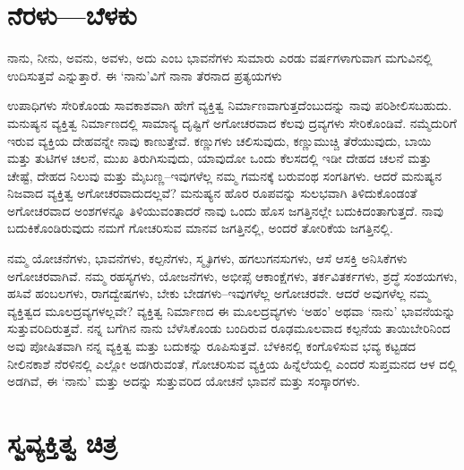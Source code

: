 \section*{ನೆರಳು—ಬೆಳಕು}


{\parfillskip=0pt ನಾನು, ನೀನು, ಅವನು, ಅವಳು, ಅದು ಎಂಬ ಭಾವನೆಗಳು ಸುಮಾರು ಎರಡು ವರ್ಷಗಳಾಗುವಾಗ ಮಗುವಿನಲ್ಲಿ ಉದಿಸುತ್ತವೆ ಎನ್ನುತ್ತಾರೆ. ಈ ‘ನಾನು’ವಿಗೆ ನಾನಾ ತೆರನಾದ ಪ್ರತ್ಯಯಗಳು \par}\newpage\noindent ಉಪಾಧಿಗಳು ಸೇರಿಕೊಂಡು ಸಾವಕಾಶವಾಗಿ ಹೇಗೆ ವ್ಯಕ್ತಿತ್ವ ನಿರ್ಮಾಣವಾಗುತ್ತದೆಂಬುದನ್ನು ನಾವು ಪರಿಶೀಲಿಸಬಹುದು. ಮನುಷ್ಯನ ವ್ಯಕ್ತಿತ್ವ ನಿರ್ಮಾಣದಲ್ಲಿ ಸಾಮಾನ್ಯ ದೃಷ್ಟಿಗೆ ಅಗೋಚರವಾದ ಕೆಲವು ದ್ರವ್ಯಗಳು ಸೇರಿಕೊಂಡಿವೆ. ನಮ್ಮೆದುರಿಗೆ ಇರುವ ವ್ಯಕ್ತಿಯ ದೇಹವನ್ನೇ ನಾವು ಕಾಣುತ್ತೇವೆ. ಕಣ್ಣುಗಳು ಚಲಿಸುವುದು, ಕಣ್ಣುಮುಚ್ಚಿ ತೆರೆಯುವುದು, ಬಾಯಿ ಮತ್ತು ತುಟಿಗಳ ಚಲನೆ, ಮುಖ ತಿರುಗಿಸುವುದು, ಯಾವುದೋ ಒಂದು ಕೆಲಸದಲ್ಲಿ ಇಡೀ ದೇಹದ ಚಲನೆ ಮತ್ತು ಚೇಷ್ಟೆ, ದೇಹದ ನಿಲುವು ಮತ್ತು ಮೈಬಣ್ಣ–ಇವುಗಳೆಲ್ಲ ನಮ್ಮ ಗಮನಕ್ಕೆ ಬರುವಂಥ ಸಂಗತಿಗಳು. ಆದರೆ ಮನುಷ್ಯನ ನಿಜವಾದ ವ್ಯಕ್ತಿತ್ವ ಅಗೋಚರವಾದುದಲ್ಲವೆ? ಮನುಷ್ಯನ ಹೊರ ರೂಪವನ್ನು ಸುಲಭವಾಗಿ ತಿಳಿದುಕೊಂಡಂತೆ ಅಗೋಚರವಾದ ಅಂಶಗಳನ್ನೂ ತಿಳಿಯುವಂತಾದರೆ ನಾವು ಒಂದು ಹೊಸ ಜಗತ್ತಿನಲ್ಲೇ ಬದುಕಿದಂತಾಗುತ್ತದೆ. ನಾವು ಬದುಕಿಕೊಂಡಿರುವುದು ನಮಗೆ ಗೋಚರಿಸುವ ಮಾನವ ಜಗತ್ತಿನಲ್ಲಿ, ಅಂದರೆ ತೋರಿಕೆಯ ಜಗತ್ತಿನಲ್ಲಿ.

ನಮ್ಮ ಯೋಚನೆಗಳು, ಭಾವನೆಗಳು, ಕಲ್ಪನೆಗಳು, ಸ್ಮೃತಿಗಳು, ಹಗಲುಗನಸುಗಳು, ಆಸೆ ಆಸಕ್ತಿ ಅನಿಸಿಕೆಗಳು ಅಗೋಚರವಾಗಿವೆ. ನಮ್ಮ ರಹಸ್ಯಗಳು, ಯೋಜನೆಗಳು, ಅಭೀಪ್ಸೆ ಆಕಾಂಕ್ಷೆಗಳು, ತರ್ಕವಿತರ್ಕಗಳು, ಶ್ರದ್ಧೆ ಸಂಶಯಗಳು, ಹಸಿವೆ ಹಂಬಲಗಳು, ರಾಗದ್ವೇಷಗಳು, ಬೇಕು ಬೇಡಗಳು–ಇವುಗಳೆಲ್ಲ ಅಗೋಚರವೇ. ಆದರೆ ಅವುಗಳೆಲ್ಲ ನಮ್ಮ ವ್ಯಕ್ತಿತ್ವದ ಮೂಲ\-ದ್ರವ್ಯ\-ಗಳಲ್ಲವೇ? ವ್ಯಕ್ತಿತ್ವ ನಿರ್ಮಾಣದ ಈ ಮೂಲದ್ರವ್ಯಗಳು ‘ಅಹಂ’ ಅಥವಾ ‘ನಾನು’ ಭಾವನೆಯನ್ನು ಸುತ್ತುವರಿದಿರುತ್ತವೆ. ನನ್ನ ಬಗೆಗಿನ ನಾನು ಬೆಳೆಸಿಕೊಂಡು ಬಂದಿರುವ ರೂಢಮೂಲವಾದ ಕಲ್ಪನೆಯ ತಾಯಿಬೇರಿನಿಂದ ಅವು ಪೋಷಿತವಾಗಿ ನನ್ನ ವ್ಯಕ್ತಿತ್ವ ಮತ್ತು ಬದುಕನ್ನು ರೂಪಿಸುತ್ತವೆ. ಬೆಳಕಿನಲ್ಲಿ ಕಂಗೊಳಿಸುವ ಭವ್ಯ ಕಟ್ಟಡದ ನೀಲಿನಕಾಶೆ ನೆರಳಿನಲ್ಲಿ ಎಲ್ಲೋ ಅಡಗಿರುವಂತೆ, ಗೋಚರಿಸುವ ವ್ಯಕ್ತಿಯ ಹಿನ್ನೆಲೆಯಲ್ಲಿ ಎಂದರೆ ಸುಪ್ತಮನದ ಆಳ ದಲ್ಲಿ ಅಡಗಿವೆ, ಈ ‘ನಾನು’ ಮತ್ತು ಅದನ್ನು ಸುತ್ತುವರಿದ ಯೋಚನೆ ಭಾವನೆ ಮತ್ತು ಸಂಸ್ಕಾರಗಳು.


\section*{ಸ್ವವ್ಯಕ್ತಿತ್ವ ಚಿತ್ರ}


